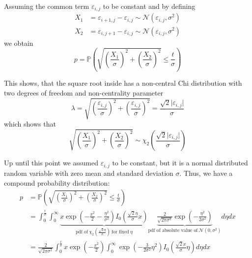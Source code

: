 \documentclass[a4paper,12pt]{article}
\newcommand{\abs}[1]{\lvert#1\rvert}
\theoremstyle{plain}
\theoremstyle{definition}
\theoremstyle{remark}
\begin{document}
Assuming the common term $\varepsilon_{i, j}$ to be constant and by defining
\begin{align*}
	X_1 &= \varepsilon_{i + 1, j} - \varepsilon_{i, j} \sim \mathcal{N}(\varepsilon_{i, j}, \sigma^2) \\
	X_2 &= \varepsilon_{i, j + 1} - \varepsilon_{i, j} \sim \mathcal{N}(\varepsilon_{i, j}, \sigma^2)
\end{align*}
we obtain
\begin{equation}
	p = \mathbb{P}\left( \sqrt{\left( \frac{X_1}{\sigma} \right)^2 + \left( \frac{X_2}{\sigma} \right)^2} \leq \frac{t}{\sigma} \right)
\end{equation}

This shows, that the square root inside has a non-central Chi distribution with two degrees of freedom and non-centrality parameter
\begin{equation}
	\lambda = \sqrt{\left( \frac{\varepsilon_{i, j}}{\sigma} \right)^2 + \left( \frac{\varepsilon_{i, j}}{\sigma} \right)^2} = \frac{\sqrt{2} \abs{\varepsilon_{i, j}}}{\sigma}
\end{equation}
which shows that
\begin{equation}
	\sqrt{\left( \frac{X_1}{\sigma} \right)^2 + \left( \frac{X_2}{\sigma} \right)^2} \sim \chi_2 \left( \frac{\sqrt{2} \abs{\varepsilon_{i, j}}}{\sigma} \right)
\end{equation}

Up until this point we assumed $\varepsilon_{i, j}$ to be constant, but it is a normal distributed random variable with zero mean and standard deviation $\sigma$. Thus, we have a compound probability distribution:
\begin{align*}
	p &= \mathbb{P}\left( \sqrt{\left( \frac{X_1}{\sigma} \right)^2 + \left( \frac{X_2}{\sigma} \right)^2} \leq \frac{t}{\sigma} \right) \\
	&= \int_0^\frac{t}{\sigma} \int_0^\infty \underbrace{x \exp \left( - \frac{x^2}{2} - \frac{\eta^2}{\sigma^2} \right) I_0 \left( \frac{\sqrt{2} \eta}{\sigma} x \right)}_{\textrm{pdf of} \ \chi_2 \left( \frac{\sqrt{2} \eta}{\sigma} \right) \ \textrm{for fixed} \ \eta} \underbrace{\frac{2}{\sqrt{2 \pi \sigma^2}} \exp \left( - \frac{\eta^2}{2 \sigma^2} \right)}_{\textrm{pdf of absolute value of} \ \mathcal{N}(0, \sigma^2)} d\eta dx \\
	&= \frac{2}{\sqrt{2 \pi \sigma^2}} \int_0^\frac{t}{\sigma} x \exp \left( - \frac{x^2}{2} \right) \int_0^\infty \exp \left( - \frac{3}{2 \sigma^2} \eta^2 \right) I_0 \left( \frac{\sqrt{2} x}{\sigma} \eta \right) d\eta dx
\end{align*}
\end{document}
